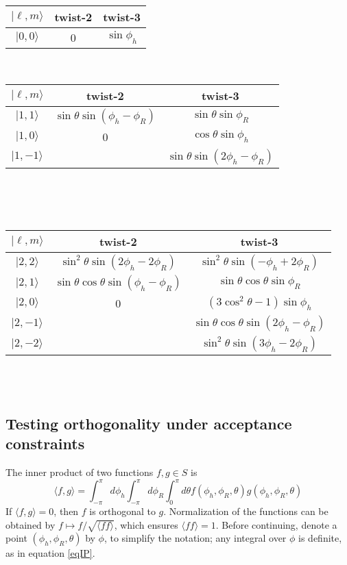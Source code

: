 \documentclass[12pt]{article}
\begin{document}
\begin{center}
\begin{tabular}{|c|c|c|}
\hline
$|\ell,m\rangle$ & twist-2 & twist-3 \\\hline\hline
$|0,0\rangle$ & 0 & $\sin\phi_h$ \\\hline
\end{tabular}
~ ~ ~
\begin{tabular}{|c|c|c|}
\hline
$|\ell,m\rangle$ & twist-2 & twist-3 \\\hline\hline
$|1,1\rangle$ & $\sin\theta\sin\left(\phi_h-\phi_R\right)$ & $\sin\theta\sin\phi_R$ \\\hline
$|1,0\rangle$ & 0 & $\cos\theta\sin\phi_h$ \\\hline
$|1,-1\rangle$ & $~$ & $\sin\theta\sin\left(2\phi_h-\phi_R\right)$ \\\hline
\end{tabular}
~\\~\\~\\
\begin{tabular}{|c|c|c|}
\hline
$|\ell,m\rangle$ & twist-2 & twist-3 \\\hline\hline
$|2,2\rangle$ & $\sin^2\theta\sin\left(2\phi_h-2\phi_R\right)$ & $\sin^2\theta\sin\left(-\phi_h+2\phi_R\right)$ \\\hline
$|2,1\rangle$ & $\sin\theta\cos\theta\sin\left(\phi_h-\phi_R\right)$ & $\sin\theta\cos\theta\sin\phi_R$ \\\hline
$|2,0\rangle$ & 0 & $\left(3\cos^2\theta-1\right)\sin\phi_h$ \\\hline
$|2,-1\rangle$ & $~$ & $\sin\theta\cos\theta\sin\left(2\phi_h-\phi_R\right)$ \\\hline
$|2,-2\rangle$ & $~$ & $\sin^2\theta\sin\left(3\phi_h-2\phi_R\right)$ \\\hline
\end{tabular}
~\\~\\
\end{center}


\subsection*{Testing orthogonality under acceptance constraints}

The inner product of two functions $f,g\in S$ is
\begin{equation}
\langle f,g\rangle=
\int_{-\pi}^{\pi}d\phi_h
\int_{-\pi}^{\pi}d\phi_R
\int_{0}^{\pi}d\theta
f\left(\phi_h,\phi_R,\theta\right)
g\left(\phi_h,\phi_R,\theta\right)
\label{eqIP}
\end{equation}
If $\langle f,g\rangle=0$, then $f$ is orthogonal to $g$. Normalization of the
functions can be obtained by $f\mapsto f/\sqrt{\langle ff\rangle}$, which
ensures $\langle ff\rangle=1$.  
Before continuing, denote a point $\left(\phi_h,\phi_R,\theta\right)$ by $\phi$,
to simplify the notation; any integral over $\phi$ is definite, as in equation
\ref{eqIP}.
\end{document}
